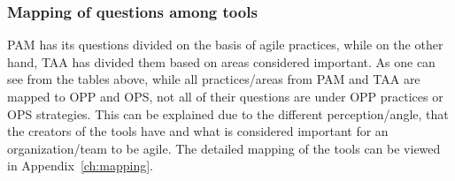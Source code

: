 \subsubsection{Mapping of questions among tools}
\label{subsubsec:mapping}

\ac{PAM} has its questions divided on the basis of agile practices, while on the other hand, \ac{TAA} has divided them based on areas considered important. As one can see from the tables above, while all practices/areas from \ac{PAM} and \ac{TAA} are mapped to \ac{OPP} and \ac{OPS}, not all of their questions are under \ac{OPP} practices or \ac{OPS} strategies. This can be explained due to the different perception/angle, that the creators of the tools have and what is considered important for an organization/team to be agile. The detailed mapping of the tools can be viewed in Appendix~\ref{ch:mapping}.


%

